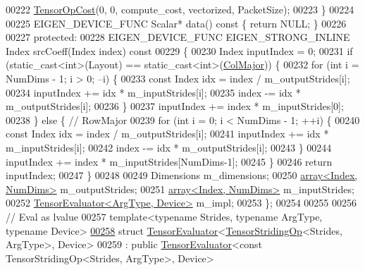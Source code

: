 \begin{DoxyCode}
00222         \hyperlink{class_eigen_1_1_tensor_op_cost}{TensorOpCost}(0, 0, compute\_cost, vectorized, PacketSize);
00223   \}
00224 
00225   EIGEN\_DEVICE\_FUNC Scalar* data()\textcolor{keyword}{ const }\{ \textcolor{keywordflow}{return} NULL; \}
00226 
00227  \textcolor{keyword}{protected}:
00228   EIGEN\_DEVICE\_FUNC EIGEN\_STRONG\_INLINE Index srcCoeff(Index index)\textcolor{keyword}{ const}
00229 \textcolor{keyword}{  }\{
00230     Index inputIndex = 0;
00231     \textcolor{keywordflow}{if} (static\_cast<int>(Layout) == static\_cast<int>(\hyperlink{group__enums_ggaacded1a18ae58b0f554751f6cdf9eb13a0cbd4bdd0abcfc0224c5fcb5e4f6669a}{ColMajor})) \{
00232       \textcolor{keywordflow}{for} (\textcolor{keywordtype}{int} i = NumDims - 1; i > 0; --i) \{
00233         \textcolor{keyword}{const} Index idx = index / m\_outputStrides[i];
00234         inputIndex += idx * m\_inputStrides[i];
00235         index -= idx * m\_outputStrides[i];
00236       \}
00237       inputIndex += index * m\_inputStrides[0];
00238     \} \textcolor{keywordflow}{else} \{  \textcolor{comment}{// RowMajor}
00239       \textcolor{keywordflow}{for} (\textcolor{keywordtype}{int} i = 0; i < NumDims - 1; ++i) \{
00240         \textcolor{keyword}{const} Index idx = index / m\_outputStrides[i];
00241         inputIndex += idx * m\_inputStrides[i];
00242         index -= idx * m\_outputStrides[i];
00243       \}
00244       inputIndex += index * m\_inputStrides[NumDims-1];
00245     \}
00246     \textcolor{keywordflow}{return} inputIndex;
00247   \}
00248 
00249   Dimensions m\_dimensions;
00250   \hyperlink{class_eigen_1_1array}{array<Index, NumDims>} m\_outputStrides;
00251   \hyperlink{class_eigen_1_1array}{array<Index, NumDims>} m\_inputStrides;
00252   \hyperlink{struct_eigen_1_1_tensor_evaluator}{TensorEvaluator<ArgType, Device>} m\_impl;
00253 \};
00254 
00255 
00256 \textcolor{comment}{// Eval as lvalue}
00257 \textcolor{keyword}{template}<\textcolor{keyword}{typename} Str\textcolor{keywordtype}{id}es, \textcolor{keyword}{typename} ArgType, \textcolor{keyword}{typename} Device>
\hyperlink{struct_eigen_1_1_tensor_evaluator_3_01_tensor_striding_op_3_01_strides_00_01_arg_type_01_4_00_01_device_01_4}{00258} \textcolor{keyword}{struct }\hyperlink{struct_eigen_1_1_tensor_evaluator}{TensorEvaluator}<\hyperlink{class_eigen_1_1_tensor_striding_op}{TensorStridingOp}<Strides, ArgType>, Device>
00259     : \textcolor{keyword}{public} \hyperlink{struct_eigen_1_1_tensor_evaluator}{TensorEvaluator}<const TensorStridingOp<Strides, ArgType>, Device>

\end{DoxyCode}
